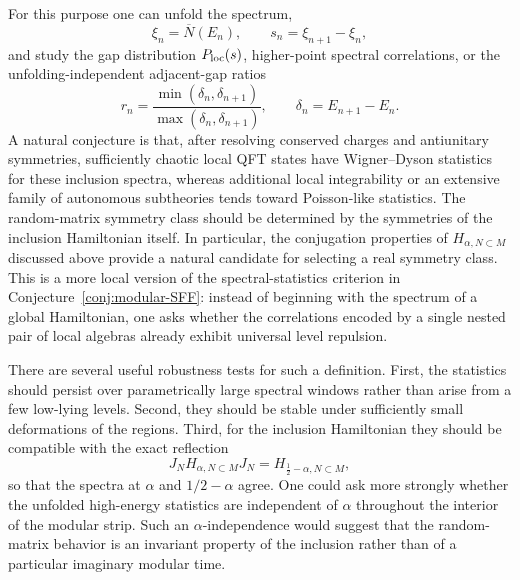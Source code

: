 \documentclass[a4paper,11pt]{article}
\theoremstyle{definition}
\begin{document}
For this purpose one can unfold the spectrum,
\begin{equation}
    \xi_n=\overline N(E_n),
    \qquad
    s_n=\xi_{n+1}-\xi_n,
    \label{eq:local-unfolded-gaps}
\end{equation}
and study the gap distribution $P_{\rm loc}(s)$, higher-point spectral correlations, or the unfolding-independent adjacent-gap ratios
\begin{equation}
    r_n
    =
    \frac{\min(\delta_n,\delta_{n+1})}
         {\max(\delta_n,\delta_{n+1})},
    \qquad
    \delta_n=E_{n+1}-E_n .
    \label{eq:local-gap-ratio}
\end{equation}
A natural conjecture is that, after resolving conserved charges and antiunitary symmetries, sufficiently chaotic local QFT states have Wigner--Dyson statistics for these inclusion spectra, whereas additional local integrability or an extensive family of autonomous subtheories tends toward Poisson-like statistics.  The random-matrix symmetry class should be determined by the symmetries of the inclusion Hamiltonian itself.  In particular, the conjugation properties of $H_{\alpha,N\subset M}$ discussed above provide a natural candidate for selecting a real symmetry class.  This is a more local version of the spectral-statistics criterion in Conjecture~\ref{conj:modular-SFF}: instead of beginning with the spectrum of a global Hamiltonian, one asks whether the correlations encoded by a single nested pair of local algebras already exhibit universal level repulsion.

There are several useful robustness tests for such a definition.  First, the statistics should persist over parametrically large spectral windows rather than arise from a few low-lying levels.  Second, they should be stable under sufficiently small deformations of the regions.  Third, for the inclusion Hamiltonian they should be compatible with the exact reflection
\begin{equation}
    J_NH_{\alpha,N\subset M}J_N
    =
    H_{\frac12-\alpha,N\subset M},
\end{equation}
so that the spectra at $\alpha$ and $1/2-\alpha$ agree.  One could ask more strongly whether the unfolded high-energy statistics are independent of $\alpha$ throughout the interior of the modular strip.  Such an $\alpha$-independence would suggest that the random-matrix behavior is an invariant property of the inclusion rather than of a particular imaginary modular time.
\end{document}
